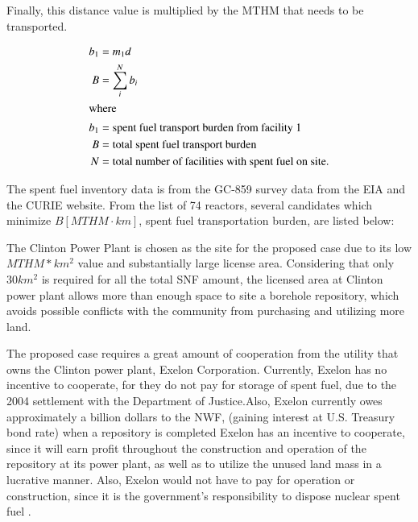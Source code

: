 Finally, this distance value is multiplied by the \gls{MTHM} that needs to be transported.


\begin{align}
        b_1 &= m_1d\\
        B &= \sum_i^N b_i\\
        \intertext{where}
        b_1 &= \mbox{spent fuel transport burden from facility 1}\\
        B &= \mbox{total spent fuel transport burden}\\
        N &= \mbox{total number of facilities with spent fuel on site.}
\end{align}

The spent fuel inventory data is from the GC-859 survey data from the \gls{EIA} 
\cite{eia} and the \gls{CURIE} website.  From the list of 74 reactors, several 
candidates which minimize $B [MTHM\cdot km]$, spent fuel transportation burden, 
are listed below:
    
\begin{table}[h]
\centering

    \caption { Reactors with relatively small MTHM*Km value}
\end {table}


The Clinton Power Plant is chosen as the site for the proposed case due to its
low $MTHM*km^2$ value and substantially large license area\cite{NRC_Clinton}.
 Considering that only
 $30km^2$ is required for all the total \gls{SNF} amount, the licensed area at Clinton
  power plant allows more than  enough space to site a borehole repository, which
   avoids possible conflicts with the community from purchasing and utilizing more
    land. 
  
  The proposed case requires a great amount of cooperation from the utility that owns
  the Clinton power plant, Exelon Corporation. Currently, Exelon has no 
  incentive to cooperate, for they do not pay for storage of spent fuel, due to 
  the 2004 settlement with the Department of Justice.Also, Exelon currently owes
  approximately a billion dollars to the \gls{NWF},
  (gaining interest at U.S. Treasury bond rate) when a repository is completed
  \cite{Ewing_2009}
  Exelon has an incentive to cooperate,
  since it will earn profit throughout the construction and operation of the 
  repository at its power plant, as well as to utilize the unused land mass
  in a lucrative manner. Also, Exelon would not have to pay for operation or 
  construction, since it is the government's responsibility to dispose nuclear
  spent fuel \cite{Ewing_2009}. 
  
